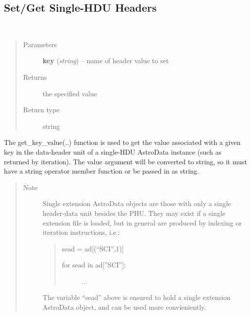 \documentclass[letterpaper,10pt,english]{sphinxmanual}
\begin{document}
\subsection{Set/Get Single-HDU Headers}
\label{chapter_AstroDataClass:set-get-single-hdu-headers}

\begin{fulllineitems}
\label{chapter_AstroDataClass:astrodata.data.AstroData.get_key_value}~\begin{quote}\begin{description}
\item[{Parameters}] \leavevmode
\textbf{key} (\emph{string}) -- name of header value to set

\item[{Returns}] \leavevmode
the specified value

\item[{Return type}] \leavevmode
string

\end{description}\end{quote}

The get\_key\_value(..) function is used to get the value associated
with a given key in the data-header unit of a single-HDU
AstroData instance (such as returned by iteration). The value argument
will be converted to string, so it must have a string operator member
function or be passed in as string.
\begin{quote}\begin{description}
\item[{Note }] \leavevmode
Single extension AstroData objects are those with only a single
header-data unit besides the PHU.  They may exist if a single
extension file is loaded, but in general are produced by indexing or
iteration instructions, i.e.:
\begin{quote}

sead = ad{[}(``SCI'',1){]}
\begin{description}
\item[{for sead in ad{[}''SCI''{]}:}] \leavevmode
...

\end{description}
\end{quote}

The variable ``sead'' above is ensured to hold a single extension
AstroData object, and can be used more convieniently.

\end{description}\end{quote}

\end{fulllineitems}
\end{document}
